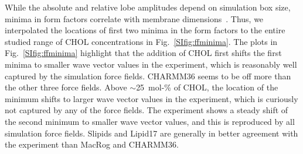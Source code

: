 \documentclass[journal=jctcce]{achemso}
\begin{document}
While the absolute and relative lobe amplitudes depend on simulation box size, minima in form factors correlate with membrane dimensions~\cite{NMRlipidsDatabank}. Thus, we interpolated the locations of first two minima in the form factors to the entire studied range of CHOL concentrations in Fig.~\ref{SIfig:ffminima}. The plots in Fig.~\ref{SIfig:ffminima} highlight that the addition of CHOL first shifts the first minima to smaller wave vector values in the experiment, which is reasonably well captured by the simulation force fields. CHARMM36 seems to be off more than the other three force fields. Above $\sim$25~mol-\% of CHOL, the location of the minimum shifts to larger wave vector values in the experiment, which is curiously not captured by any of the force fields. The experiment shows a steady shift of the second minimum to smaller wave vector values, and this is reproduced by all simulation force fields. Slipids and Lipid17 are generally in better agreement with the experiment than MacRog and CHARMM36.
\end{document}
